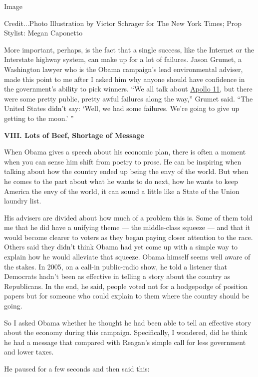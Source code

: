 Image

Credit...Photo Illustration by Victor Schrager for The New York Times;
Prop Stylist: Megan Caponetto

More important, perhaps, is the fact that a single success, like the
Internet or the Interstate highway system, can make up for a lot of
failures. Jason Grumet, a Washington lawyer who is the Obama campaign's
lead environmental adviser, made this point to me after I asked him why
anyone should have confidence in the government's ability to pick
winners. ``We all talk about
\href{http://www.nasm.si.edu/collections/imagery/Apollo/AS11/a11.htm}{Apollo
11}, but there were some pretty public, pretty awful failures along the
way,'' Grumet said. ``The United States didn't say: `Well, we had some
failures. We're going to give up getting to the moon.' ''

\textbf{VIII. Lots of Beef, Shortage of Message}

When Obama gives a speech about his economic plan, there is often a
moment when you can sense him shift from poetry to prose. He can be
inspiring when talking about how the country ended up being the envy of
the world. But when he comes to the part about what he wants to do next,
how he wants to keep America the envy of the world, it can sound a
little like a State of the Union laundry list.

His advisers are divided about how much of a problem this is. Some of
them told me that he did have a unifying theme --- the middle-class
squeeze --- and that it would become clearer to voters as they began
paying closer attention to the race. Others said they didn't think Obama
had yet come up with a simple way to explain how he would alleviate that
squeeze. Obama himself seems well aware of the stakes. In 2005, on a
call-in public-radio show, he told a listener that Democrats hadn't been
as effective in telling a story about the country as Republicans. In the
end, he said, people voted not for a hodgepodge of position papers but
for someone who could explain to them where the country should be going.

So I asked Obama whether he thought he had been able to tell an
effective story about the economy during this campaign. Specifically, I
wondered, did he think he had a message that compared with Reagan's
simple call for less government and lower taxes.

He paused for a few seconds and then said this:

